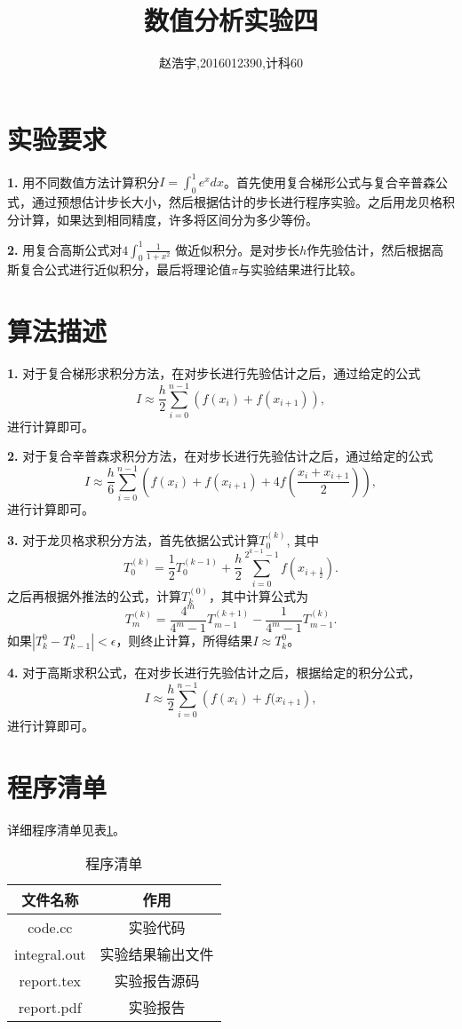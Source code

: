 \documentclass{article}
\title{\bf\huge 数值分析实验四}
\author{赵浩宇,2016012390,计科60}
\theoremstyle{plain}
\theoremstyle{definition}
\theoremstyle{remark}
\begin{document}
    
    \maketitle
    
    \section{实验要求}
    \textbf{1.} 用不同数值方法计算积分$I = \int_0^1 e^xdx$。首先使用复合梯形公式与复合辛普森公式，通过预想估计步长大小，然后根据估计的步长进行程序实验。之后用龙贝格积分计算，如果达到相同精度，许多将区间分为多少等份。

    \textbf{2.} 用复合高斯公式对$4\int_0^1 \frac{1}{1+x^2}$ 做近似积分。是对步长$h$作先验估计，然后根据高斯复合公式进行近似积分，最后将理论值$\pi$与实验结果进行比较。
    
    \section{算法描述}
    \textbf{1.} 对于复合梯形求积分方法，在对步长进行先验估计之后，通过给定的公式
    \[I \approx \frac{h}{2}\sum_{i=0}^{n-1}\left(f(x_i) + f(x_{i+1})\right),\]
    进行计算即可。

    \textbf{2.} 对于复合辛普森求积分方法，在对步长进行先验估计之后，通过给定的公式
    \[I \approx \frac{h}{6}\sum_{i=0}^{n-1}\left(f(x_i) + f(x_{i+1}) + 4f\left(\frac{x_i+x_{i+1}}{2}\right)\right),\]
    进行计算即可。

    \textbf{3.} 对于龙贝格求积分方法，首先依据公式计算$T_0^{(k)}$, 其中
    \[T_0^{(k)} = \frac{1}{2}T_0^{(k-1)} + \frac{h}{2}\sum_{i=0}^{2^{k-1}-1}f(x_{i+\frac{1}{2}}).\]
    之后再根据外推法的公式，计算$T_k^{(0)}$，其中计算公式为
    \[T_m^{(k)} = \frac{4^m}{4^m-1}T_{m-1}^{(k+1)} - \frac{1}{4^m-1}T_{m-1}^{(k)}.\]
    如果$|T_k^{0} - T_{k-1}^0|<\epsilon$，则终止计算，所得结果$I\approx T_k^0$。

    \textbf{4.} 对于高斯求积公式，在对步长进行先验估计之后，根据给定的积分公式，
    \[I \approx \frac{h}{2}\sum_{i=0}^{n-1}\left(f(x_i) + f(x_{i+1}\right),\]
    进行计算即可。
    
    
    \section{程序清单}
    详细程序清单见表\ref{list}。
    \begin{table}[!htbp]
        \centering
        \begin{tabular}{c|c}
            \hline
            \hline
            文件名称 & 作用 \\
            \hline
            code.cc & 实验代码\\
            integral.out & 实验结果输出文件\\
            report.tex & 实验报告源码\\
            report.pdf & 实验报告\\
            \hline
            \hline
        \end{tabular}
        \caption{程序清单}
        \label{list}
    \end{table}
\end{document}
